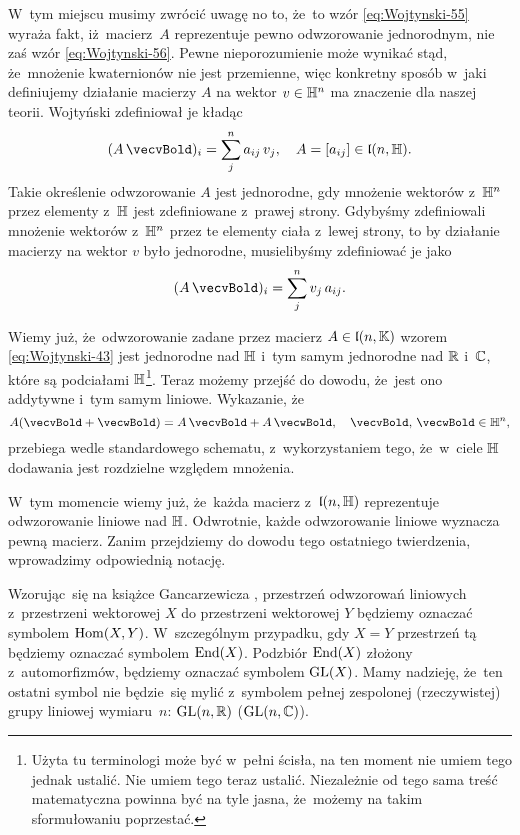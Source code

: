 \documentclass[a4paper,11pt]{article}
\numberwithin{equation}{section}
\begin{document}
W~tym miejscu musimy zwrócić uwagę no to, że~to wzór \eqref{eq:Wojtynski-55}
wyraża fakt, iż~macierz~$A$ reprezentuje pewno odwzorowanie jednorodnym,
nie zaś wzór \eqref{eq:Wojtynski-56}. Pewne nieporozumienie może wynikać
stąd, że~mnożenie kwaternionów nie jest przemienne, więc konkretny sposób
w~jaki definiujemy działanie macierzy $A$ na wektor $v \in \mathbb{H}^{ n }$ ma
znaczenie dla naszej teorii. Wojtyński zdefiniował je kładąc
\begin{equation}
  \label{eq:Wojtynski-59}
  ( A \, \vecvBold )_{ i } = \sum_{ j }^{ n } a_{ i j } \, v_{ j }, \quad
  A = [ a_{ ij } ] \in \lFrak( n, \Hbb ).
\end{equation}
Takie określenie odwzorowanie $A$ jest jednorodne, gdy mnożenie wektorów
z~$\mathbb{H}^{ n }$ przez elementy z~$\mathbb{H}$ jest zdefiniowane z~prawej strony.
Gdybyśmy zdefiniowali mnożenie wektorów z~$\mathbb{H}^{ n }$ przez te elementy
ciała z~lewej strony, to by działanie macierzy na wektor $v$ było
jednorodne, musielibyśmy zdefiniować je jako
\begin{equation}
  \label{eq:Wojtynski-60}
  ( A \, \vecvBold )_{ i } = \sum_{ j }^{ n } v_{ j } \, a_{ i j }.
\end{equation}

Wiemy już, że~odwzorowanie zadane przez macierz $A \in \mathfrak{l}( n, \mathbb{K} )$
wzorem \eqref{eq:Wojtynski-43} jest jednorodne nad $\mathbb{H}$ i~tym samym
jednorodne nad $\mathbb{R}$ i~$\mathbb{C}$, które są podciałami $\mathbb{H}$\footnote{Użyta
  tu terminologi może być w~pełni ścisła, na ten moment nie umiem tego
  jednak ustalić. Nie umiem tego teraz ustalić. Niezależnie od tego sama
  treść matematyczna powinna być na tyle jasna, że~możemy na takim
  sformułowaniu poprzestać.}. Teraz możemy przejść do dowodu, że~jest ono
addytywne i~tym samym liniowe. Wykazanie, że
\begin{equation}
  \label{eq:Wojtynski-61}
  A ( \vecvBold + \vecwBold ) = A \, \vecvBold + A \, \vecwBold, \quad
  \vecvBold, \, \vecwBold \in \Hbb^{ n },
\end{equation}
przebiega wedle standardowego schematu, z~wykorzystaniem tego, że~w~ciele
$\mathbb{H}$ dodawania jest rozdzielne względem mnożenia.

W~tym momencie wiemy już, że~każda macierz z~$\mathfrak{l}( n, \mathbb{H} )$
reprezentuje odwzorowanie liniowe nad $\mathbb{H}$. Odwrotnie, każde odwzorowanie
liniowe wyznacza pewną macierz. Zanim przejdziemy do dowodu tego ostatniego twierdzenia, wprowadzimy odpowiednią notację.

Wzorując~się na książce Gancarzewicza
\cite{GancarzewiczAlgebraLiniowa2004}, przestrzeń odwzorowań liniowych
z~przestrzeni wektorowej $X$ do przestrzeni wektorowej $Y$ będziemy
oznaczać symbolem $\mathrm{Hom}( X, Y )$. W~szczególnym przypadku, gdy $X = Y$
przestrzeń tą będziemy oznaczać symbolem $\mathrm{End}( X )$. Podzbiór $\mathrm{End}( X )$
złożony z~automorfizmów, będziemy oznaczać symbolem $\mathrm{GL}( X )$. Mamy
nadzieję, że~ten ostatni symbol nie będzie~się mylić z~symbolem pełnej
zespolonej (rzeczywistej) grupy liniowej wymiaru~$n$: $\mathrm{GL}( n, \mathbb{R} )$
($\mathrm{GL}( n, \mathbb{C} )$).
\end{document}
